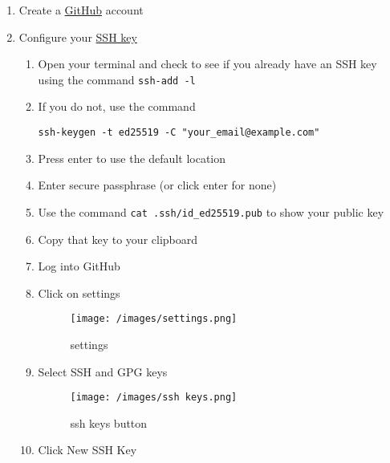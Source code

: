 \documentclass[
  letterpaper,
  DIV=11,
  numbers=noendperiod]{scrartcl}
\providecommand{\tightlist}{%
  \setlength{\itemsep}{0pt}\setlength{\parskip}{0pt}}\usepackage{longtable,booktabs,array}
\begin{document}
\begin{enumerate}
\def\labelenumi{\arabic{enumi}.}
\tightlist
\item
  Create a \href{https://github.com/}{GitHub} account
\item
  Configure your
  \href{https://docs.github.com/en/authentication/connecting-to-github-with-ssh/adding-a-new-ssh-key-to-your-github-account}{SSH
  key}

  \begin{enumerate}
  \def\labelenumii{\arabic{enumii}.}
  \item
    Open your terminal and check to see if you already have an SSH key
    using the command \texttt{ssh-add\ -l}
  \item
    If you do not, use the command

\begin{verbatim}
ssh-keygen -t ed25519 -C "your_email@example.com"
\end{verbatim}
  \item
    Press enter to use the default location
  \item
    Enter secure passphrase (or click enter for none)
  \item
    Use the command \texttt{cat\ .ssh/id\_ed25519.pub} to show your
    public key
  \item
    Copy that key to your clipboard
  \item
    Log into GitHub
  \item
    Click on settings

    \begin{figure}

    {\centering \texttt{[image: /images/settings.png]}

    }

    \caption{settings}

    \end{figure}
  \item
    Select SSH and GPG keys

    \begin{figure}

    {\centering \texttt{[image: /images/ssh keys.png]}

    }

    \caption{ssh keys button}

    \end{figure}
  \item
    Click New SSH Key


\end{enumerate}
\end{enumerate}
\end{document}
